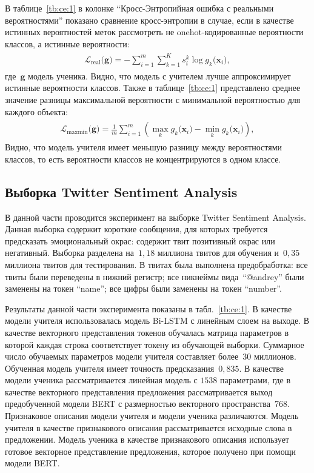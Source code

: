 \documentclass[12pt]{a&t}
\begin{document}
В таблице~\ref{tb:ce:1} в колонке ``Кросс-Энтропийная ошибка с реальными вероятностями'' показано сравнение кросс-энтропии в случае, если в качестве истинных вероятностей меток рассмотреть не onehot-кодированные вероятности классов, а истинные вероятности:
\begin{gather}
\label{eq:ce:1}
\begin{aligned}
\mathcal{L}_{\text{real}}\bigr(\mathbf{g}\bigr) = - \sum_{i=1}^{m}\sum_{k=1}^{K}s_{i}^{k}\log g_k\bigr(\mathbf{x}_i\bigr),
\end{aligned}
\end{gather}
где~$\mathbf{g}$ модель ученика. Видно, что модель с учителем лучше аппроксимирует истинные вероятности классов. Также в таблице~\ref{tb:ce:1} представлено среднее значение разницы максимальной вероятности с минимальной вероятностью для каждого объекта:
\begin{gather}
\label{eq:ce:2}
\begin{aligned}
\mathcal{L}_{\text{maxmin}}\bigr(\mathbf{g}\bigr) = \frac{1}{m}\sum_{i=1}^{m}\left(\max_{k}g_k\bigr(\mathbf{x}_i\bigr) -  \min_{k}g_k\bigr(\mathbf{x}_i\bigr)\right),
\end{aligned}
\end{gather}
Видно, что модель учителя имеет меньшую разницу между вероятностями классов, то есть вероятности классов не концентрируются в одном классе.

\subsection{Выборка Twitter Sentiment Analysis}
В данной части проводится эксперимент на выборке Twitter Sentiment Analysis. Данная выборка содержит короткие сообщения, для которых требуется предсказать эмоциональный окрас: содержит твит позитивный окрас или негативный. Выборка разделена на~$1{,}18$ миллиона твитов для обучения и~$0{,}35$ миллиона твитов для тестирования. В твитах была выполнена предобработка: все твиты были переведены в нижний регистр; все никнеймы вида~``@andrey'' были заменены на токен ``name''; все цифры были заменены на токен ``number''.

Результаты данной части эксперимента показаны в табл.~\ref{tb:ce:1}. В качестве модели учителя использовалась модель Bi-LSTM с линейным слоем на выходе. В качестве векторного представления токенов обучалась матрица параметров в которой каждая строка соответствует токену из обучающей выборки. Суммарное число обучаемых параметров модели учителя составляет более~$30$ миллионов. Обученная модель учителя имеет точность предсказания~$0{,}835$. В качестве модели ученика рассматривается линейная модель с $1538$ параметрами, где в качестве векторного представления предложения рассматривается выход предобученной модели BERT с размерностью векторного пространства~$768$. Признаковое описания модели учителя и модели ученика различаются. Модель учителя в качестве признакового описания рассматривается исходные слова в предложении. Модель ученика в качестве признакового описания использует готовое векторное представление предложения, которое получено при помощи модели BERT.
\end{document}
